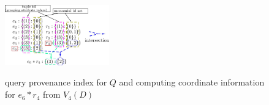 \begin{example}
\begin{figure}[t!]
    \centering
    \includegraphics[width=0.4\textwidth,height=0.2\textwidth]{Figures/intersection.jpg}
    \caption{query provenance index for $Q$ and computing coordinate information for $e_6*r_4$ from $V_4(D)$}
    \small \label{fig:query prov index}
\end{figure}





\end{example}
